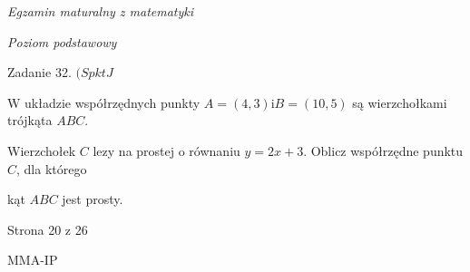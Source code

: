 \documentclass[a4paper,12pt]{article}
\begin{document}
{\it Egzamin maturalny z matematyki}

{\it Poziom podstawowy}

Zadanie 32. $(SpktJ$

$\mathrm{W}$ układzie współrzędnych punkty $A=(4,3) \mathrm{i} B=(10,5)$ są wierzchołkami trójkąta $ABC.$

Wierzchołek $C$ lezy na prostej o równaniu $y=2x+3$. Oblicz współrzędne punktu $C$, dla którego

kąt $ABC$ jest prosty.

Strona 20 z 26

MMA-IP
\end{document}
